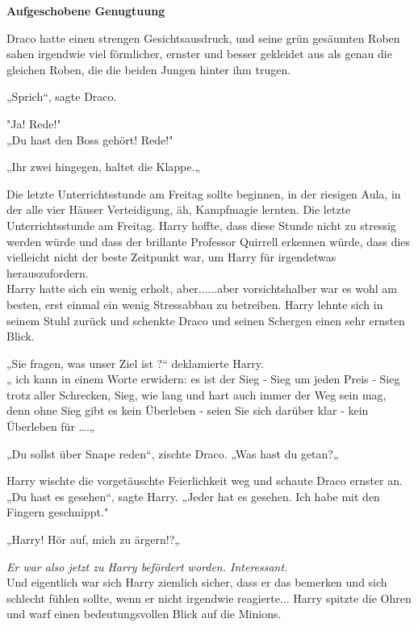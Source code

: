 

\hypertarget{aufgeschobene-genugtuung}{%

\textbf{Aufgeschobene Genugtuung}

\hfill\break Draco hatte einen strengen Gesichtsausdruck, und seine grün gesäumten Roben sahen irgendwie viel förmlicher, ernster und besser gekleidet aus als genau die gleichen Roben, die die beiden Jungen hinter ihm trugen.

„Sprich“, sagte Draco.

"Ja! Rede!"\\ „Du hast den Boss gehört! Rede!"

„Ihr zwei hingegen, haltet die Klappe.„

Die letzte Unterrichtsstunde am Freitag sollte beginnen, in der riesigen Aula, in der alle vier Häuser Verteidigung, äh, Kampfmagie lernten. Die letzte Unterrichtsstunde am Freitag. Harry hoffte, dass diese Stunde nicht zu stressig werden würde und dass der brillante Professor Quirrell erkennen würde, dass dies vielleicht nicht der beste Zeitpunkt war, um Harry für irgendetwas herauszufordern.\\ Harry hatte sich ein wenig erholt, aber......aber vorsichtshalber war es wohl am besten, erst einmal ein wenig Stressabbau zu betreiben. Harry lehnte sich in seinem Stuhl zurück und schenkte Draco und seinen Schergen einen sehr ernsten Blick.

„Sie fragen, was unser Ziel ist ?“ deklamierte Harry.\\ „ ich kann in einem Worte erwidern: es ist der Sieg - Sieg um jeden Preis - Sieg trotz aller Schrecken, Sieg, wie lang und hart auch immer der Weg sein mag, denn ohne Sieg gibt es kein Überleben - seien Sie sich darüber klar - kein Überleben für ….„

„Du sollst über Snape reden“, zischte Draco. „Was hast du getan?„

Harry wischte die vorgetäuschte Feierlichkeit weg und schaute Draco ernster an.\\ „Du hast es gesehen“, sagte Harry. „Jeder hat es gesehen. Ich habe mit den Fingern geschnippt."

„Harry! Hör auf, mich zu ärgern!?„

\emph{Er war also jetzt zu Harry befördert worden. Interessant.}\\ Und eigentlich war sich Harry ziemlich sicher, dass er das bemerken und sich schlecht fühlen sollte, wenn er nicht irgendwie reagierte... Harry spitzte die Ohren und warf einen bedeutungsvollen Blick auf die Minions.

}
